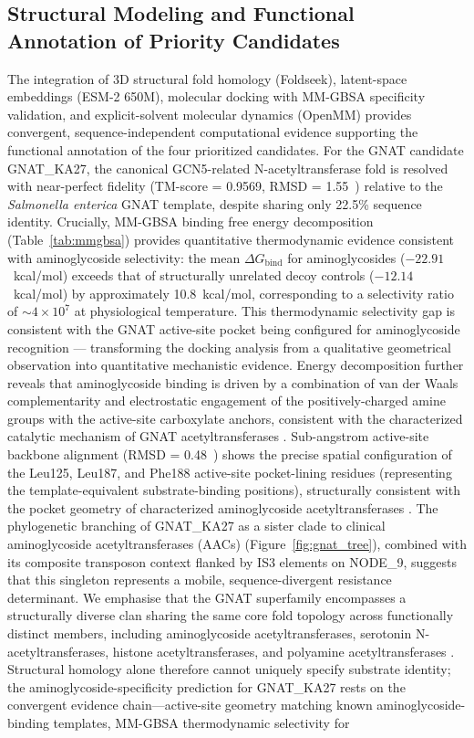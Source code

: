 \documentclass[pdflatex,sn-mathphys-num]{sn-jnl}
\begin{document}
\subsection{Structural Modeling and Functional Annotation of Priority Candidates}\label{subsec:discussion_priority_candidates}
The integration of 3D structural fold homology (Foldseek), latent-space embeddings (ESM-2 650M), molecular docking with MM-GBSA specificity validation, and explicit-solvent molecular dynamics (OpenMM) provides convergent, sequence-independent computational evidence supporting the functional annotation of the four prioritized candidates. For the GNAT candidate GNAT\_KA27, the canonical GCN5-related N-acetyltransferase fold is resolved with near-perfect fidelity (TM-score = 0.9569, RMSD = 1.55~\text{\AA}) relative to the \textit{Salmonella enterica} GNAT template, despite sharing only 22.5\% sequence identity. Crucially, MM-GBSA binding free energy decomposition (Table~\ref{tab:mmgbsa}) provides quantitative thermodynamic evidence consistent with aminoglycoside selectivity: the mean $\Delta G_{\text{bind}}$ for aminoglycosides ($-22.91$~kcal/mol) exceeds that of structurally unrelated decoy controls ($-12.14$~kcal/mol) by approximately 10.8~kcal/mol, corresponding to a selectivity ratio of $\sim\!4\times10^7$ at physiological temperature. This thermodynamic selectivity gap is consistent with the GNAT active-site pocket being configured for aminoglycoside recognition — transforming the docking analysis from a qualitative geometrical observation into quantitative mechanistic evidence. Energy decomposition further reveals that aminoglycoside binding is driven by a combination of van der Waals complementarity and electrostatic engagement of the positively-charged amine groups with the active-site carboxylate anchors, consistent with the characterized catalytic mechanism of GNAT acetyltransferases \cite{llano2002aminoglycoside,vetting2005structure}. Sub-angstrom active-site backbone alignment (RMSD = 0.48~\text{\AA}) shows the precise spatial configuration of the Leu125, Leu187, and Phe188 active-site pocket-lining residues (representing the template-equivalent substrate-binding positions), structurally consistent with the pocket geometry of characterized aminoglycoside acetyltransferases \cite{llano2002aminoglycoside,shaw1983chloramphenicol}. The phylogenetic branching of GNAT\_KA27 as a sister clade to clinical aminoglycoside acetyltransferases (AACs) (Figure~\ref{fig:gnat_tree}), combined with its composite transposon context flanked by IS3 elements on NODE\_9, suggests that this singleton represents a mobile, sequence-divergent resistance determinant. We emphasise that the GNAT superfamily encompasses a structurally diverse clan sharing the same core fold topology across functionally distinct members, including aminoglycoside acetyltransferases, serotonin N-acetyltransferases, histone acetyltransferases, and polyamine acetyltransferases \cite{vetting2005structure}. Structural homology alone therefore cannot uniquely specify substrate identity; the aminoglycoside-specificity prediction for GNAT\_KA27 rests on the convergent evidence chain—active-site geometry matching known aminoglycoside-binding templates, MM-GBSA thermodynamic selectivity for 
\end{document}
